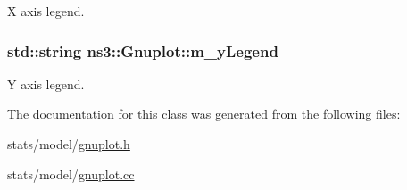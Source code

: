 X axis legend. 

\subsubsection[{\texorpdfstring{m\+\_\+y\+Legend}{m_yLegend}}]{\setlength{\rightskip}{0pt plus 5cm}std\+::string ns3\+::\+Gnuplot\+::m\+\_\+y\+Legend\hspace{0.3cm}{\ttfamily [private]}}\hypertarget{classns3_1_1Gnuplot_a2de2eaa271e443b018df1928b19bd707}{}\label{classns3_1_1Gnuplot_a2de2eaa271e443b018df1928b19bd707}


Y axis legend. 



The documentation for this class was generated from the following files\+:\begin{DoxyCompactItemize}
\item 
stats/model/\hyperlink{gnuplot_8h}{gnuplot.\+h}\item 
stats/model/\hyperlink{gnuplot_8cc}{gnuplot.\+cc}\end{DoxyCompactItemize}
